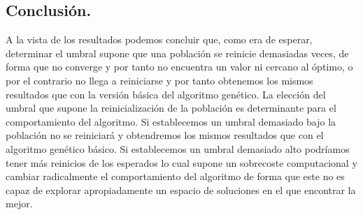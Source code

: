 \documentclass[12pt]{article}
\numberwithin{figure}{section} %
\numberwithin{table}{section} %
\begin{document}
	\subsection[Conclusión.]{Conclusión.}
	
	A la vista de los resultados podemos concluir que, como era de esperar, determinar el umbral supone que una población se reinicie demasiadas veces, de forma que no converge y por tanto no encuentra un valor ni cercano al óptimo, o por el contrario no llega a reiniciarse y por tanto obtenemos los mismos resultados que con la versión básica del algoritmo genético. La elección del umbral que supone la reinicialización de la población es determinante para el comportamiento del algoritmo. Si establecemos un umbral demasiado bajo la población no se reiniciará y obtendremos los mismos resultados que con el algoritmo genético básico. Si establecemos un umbral demasiado alto podríamos tener más reinicios de los esperados lo cual supone un sobrecoste computacional y cambiar radicalmente el comportamiento del algoritmo de forma que este no es capaz de explorar apropiadamente un espacio de soluciones en el que encontrar la mejor.
\end{document}
